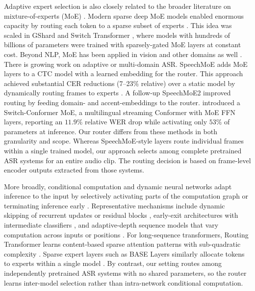 \documentclass[journal]{IEEEtran}
\begin{document}
Adaptive expert selection is also closely related to the broader literature on mixture-of-experts (MoE) \cite{jacobs1991,jordan1994hierarchial,yuksel2012twenty}. Modern sparse deep MoE models enabled enormous capacity by routing each token to a sparse subset of experts \cite{shazeer2017outrageously}. This idea was scaled in GShard \cite{gshard} and Switch Transformer \cite{fedus2021switch}, where models with hundreds of billions of parameters were trained with sparsely-gated MoE layers at constant cost. Beyond NLP, MoE has been applied in vision and other domains as well \cite{yuksel2012twenty,riquelme2021vmoe}. There is growing work on adaptive or multi-domain ASR. SpeechMoE \cite{you2021speechmoe} adds MoE layers to a CTC model with a learned embedding for the router. This approach achieved substantial CER reductions (7--23\% relative) over a static model by dynamically routing frames to experts \cite{you2021speechmoe}. A follow-up SpeechMoE2 \cite{speechmoe2} improved routing by feeding domain- and accent-embeddings to the router. \cite{hu2023moeconformer} introduced a Switch-Conformer MoE, a multilingual
streaming Conformer with MoE FFN layers, reporting an $11.9\%$ relative WER drop while activating only $53\%$ of parameters at inference. Our router differs from these methods in both granularity and scope. Whereas SpeechMoE-style layers route individual frames within a single trained model, our approach selects among complete pretrained ASR systems for an entire audio clip. The routing decision is based on frame-level encoder outputs extracted from those systems.

More broadly, conditional computation and dynamic neural networks adapt inference to the input by selectively activating parts of the computation graph or terminating inference early \cite{han2022dynamic,scardapane2024conditional,laskaridis2021adaptive}. Representative mechanisms include dynamic skipping of recurrent updates or residual blocks \cite{campos2018skip,wu2018blockdrop,wang2018skipnet}, early-exit architectures with intermediate classifiers \cite{teerapittayanon2016branchynet,huang2018msdnet,xin2020deebert}, and adaptive-depth sequence models that vary computation across inputs or positions \cite{graves2016adaptive,dehghani2019universal,elbayad2020depth}. For long-sequence transformers, Routing Transformer learns content-based sparse attention patterns with sub-quadratic complexity \cite{roy-efficient}. Sparse expert layers such as BASE Layers similarly allocate tokens to experts within a single model \cite{lewis2021base}. By contrast, our setting routes among independently pretrained ASR systems with no shared parameters, so the router learns inter-model selection rather than intra-network conditional computation. 
\end{document}
